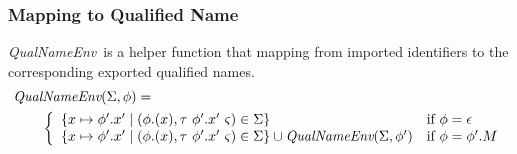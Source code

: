 \documentclass[a4paper]{article}
\newcommand{\If}{\mbox{if}}
\newcommand{\QualNameEnv}{\emph{QualNameEnv}}
\begin{document}
\subsubsection{Mapping to Qualified Name}
\QualNameEnv\ is a helper function that mapping from imported identifiers to the corresponding exported qualified names.
\begin{equation*}
\begin{split}
&\QualNameEnv (\Sigma, \phi) = \\
&\qquad \left\{\begin{array}{ll}
\{ x \mapsto \phi'.x' \mid (\phi.(x), \tau\ \phi'.x'\ \varsigma) \in \Sigma \} & \If\ \phi = \epsilon \\
\{ x \mapsto \phi'.x' \mid (\phi.(x), \tau\ \phi'.x'\ \varsigma) \in \Sigma \} \cup \QualNameEnv (\Sigma, \phi') & \If\ \phi = \phi'.M
\end{array}\right.
\end{split}
\end{equation*}
\end{document}
